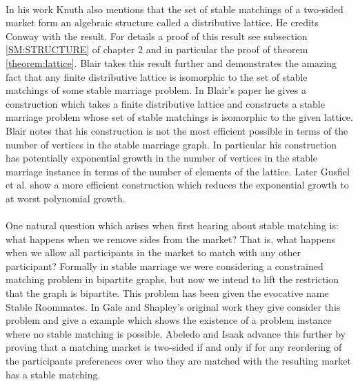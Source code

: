 \paragraph{}
In his work Knuth also mentions that the set of stable matchings of a two-sided market form an algebraic structure called a distributive lattice. He credits Conway with the result. For details a proof of this result see subsection \ref{SM:STRUCTURE} of chapter $2$ and in particular the proof of theorem \ref{theorem:lattice}. Blair  \cite{blair1984every} takes this result further and demonstrates the amazing fact that any finite distributive lattice is isomorphic to the set of stable matchings of some stable marriage problem. In Blair's paper he gives a construction which takes a finite distributive lattice and constructs a stable marriage problem whose set of stable matchings is isomorphic to the given lattice. Blair notes that his construction is not the most efficient possible in terms of the number of vertices in the stable marriage graph. In particular his construction has potentially exponential growth in the number of vertices in the stable marriage instance in terms of the number of elements of the lattice. Later Gusfiel et al. \cite{gusfield1987every} show a more efficient construction which reduces the exponential growth to at worst polynomial growth. 
\paragraph{}
One natural question which arises when first hearing about stable matching is: what happens when we remove sides from the market? That is, what happens when we allow all participants in the market to match with any other participant? Formally in stable marriage we were considering a constrained matching problem in bipartite graphs, but now we intend to lift the restriction that the graph is bipartite. This problem has been given the evocative name Stable Roommates. In Gale and Shapley's original work \cite{gale1962college} they give consider this problem and give a example which shows the existence of a problem instance where no stable matching is possible.  Abeledo and Isaak \cite{abeledo1991characterization} advance this further by proving that a matching market is two-sided if and only if for any reordering of the participants preferences over who they are matched with the resulting market has a stable matching.
